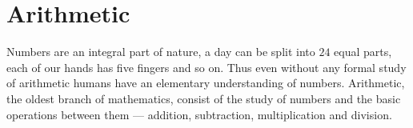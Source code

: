 \chapter{Arithmetic}\label{arit}





Numbers are an integral part of nature, a day can be split into $24$ equal parts, each of our hands has five fingers and so on. Thus even without any formal study of arithmetic humans have an elementary understanding of numbers. Arithmetic, the oldest branch of mathematics, consist of the study of numbers and the basic operations between them — addition, subtraction, multiplication and division.

